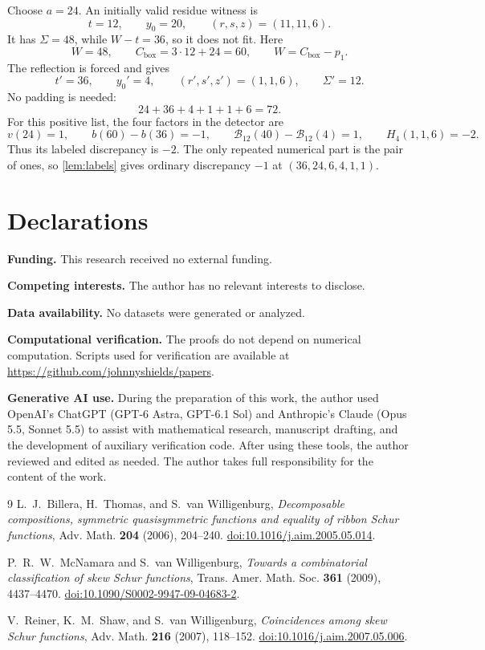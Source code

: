 \documentclass[11pt,a4paper]{amsart}
\numberwithin{equation}{section}
\theoremstyle{plain}
\theoremstyle{definition}
\begin{document}
Choose \(a=24\).  An initially valid residue witness is
\[
t=12,\qquad y_0=20,\qquad (r,s,z)=(11,11,6).
\]
It has \(\Sigma=48\), while \(W-t=36\), so it does not fit.
Here
\[
W=48,\qquad C_{\mathrm{box}}=3\cdot12+24=60,
\qquad W=C_{\mathrm{box}}-p_1.
\]
The reflection is forced and gives
\[
t'=36,\qquad y_0'=4,\qquad(r',s',z')=(1,1,6),\qquad\Sigma'=12.
\]
No padding is needed:
\[
24+36+4+1+1+6=72.
\]
For this positive list, the four factors in the detector are
\[
v(24)=1,\qquad b(60)-b(36)=-1,\qquad
\mathcal B_{12}(40)-\mathcal B_{12}(4)=1,
\qquad H_4(1,1,6)=-2.
\]
Thus its labeled discrepancy is \(-2\).  The only repeated numerical part
is the pair of ones, so \cref{lem:labels} gives ordinary discrepancy
\(-1\) at \((36,24,6,4,1,1)\).

\section*{Declarations}
{\footnotesize
\noindent\textbf{Funding.} This research received no external funding.

\smallskip
\noindent\textbf{Competing interests.} The author has no relevant interests to disclose.

\smallskip
\noindent\textbf{Data availability.} No datasets were generated or analyzed.

\smallskip
\noindent\textbf{Computational verification.} The proofs do not depend on numerical computation.  Scripts used for verification are available at \url{https://github.com/johnnyshields/papers}.

\smallskip
\noindent\textbf{Generative AI use.} During the preparation of this work, the author used OpenAI's ChatGPT (GPT-6 Astra, GPT-6.1 Sol) and Anthropic's Claude (Opus 5.5, Sonnet 5.5) to assist with mathematical research, manuscript drafting, and the development of auxiliary verification code.  After using these tools, the author reviewed and edited as needed.  The author takes full responsibility for the content of the work.
\par}

\begingroup
\raggedright
\begin{thebibliography}{9}
L.~J.~Billera, H.~Thomas, and S.~van Willigenburg,
\emph{Decomposable compositions, symmetric quasisymmetric functions and
equality of ribbon Schur functions},
Adv. Math. \textbf{204} (2006), 204--240.
\href{https://doi.org/10.1016/j.aim.2005.05.014}{doi:10.1016/\allowbreak j.aim.2005.05.014}.

P.~R.~W.~McNamara and S.~van Willigenburg,
\emph{Towards a combinatorial classification of skew Schur functions},
Trans. Amer. Math. Soc. \textbf{361} (2009), 4437--4470.
\href{https://doi.org/10.1090/S0002-9947-09-04683-2}{doi:10.1090/\allowbreak S0002-9947-09-04683-2}.

V.~Reiner, K.~M.~Shaw, and S.~van Willigenburg,
\emph{Coincidences among skew Schur functions},
Adv. Math. \textbf{216} (2007), 118--152.
\href{https://doi.org/10.1016/j.aim.2007.05.006}{doi:10.1016/\allowbreak j.aim.2007.05.006}.
\end{thebibliography}
\endgroup
\end{document}
